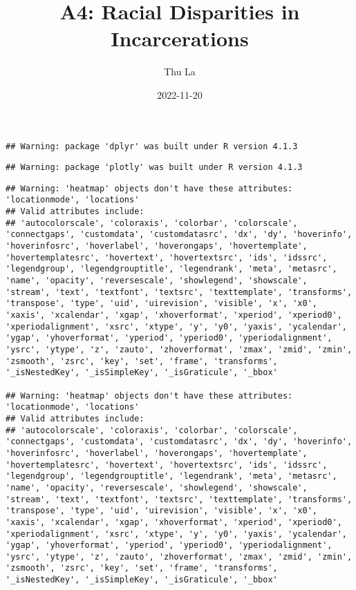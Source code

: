 \documentclass[
]{article}
\title{A4: Racial Disparities in Incarcerations}
\author{Thu La}
\date{2022-11-20}
\begin{document}
\maketitle

\begin{verbatim}
## Warning: package 'dplyr' was built under R version 4.1.3
\end{verbatim}

\begin{verbatim}
## Warning: package 'plotly' was built under R version 4.1.3
\end{verbatim}

\begin{verbatim}
## Warning: 'heatmap' objects don't have these attributes: 'locationmode', 'locations'
## Valid attributes include:
## 'autocolorscale', 'coloraxis', 'colorbar', 'colorscale', 'connectgaps', 'customdata', 'customdatasrc', 'dx', 'dy', 'hoverinfo', 'hoverinfosrc', 'hoverlabel', 'hoverongaps', 'hovertemplate', 'hovertemplatesrc', 'hovertext', 'hovertextsrc', 'ids', 'idssrc', 'legendgroup', 'legendgrouptitle', 'legendrank', 'meta', 'metasrc', 'name', 'opacity', 'reversescale', 'showlegend', 'showscale', 'stream', 'text', 'textfont', 'textsrc', 'texttemplate', 'transforms', 'transpose', 'type', 'uid', 'uirevision', 'visible', 'x', 'x0', 'xaxis', 'xcalendar', 'xgap', 'xhoverformat', 'xperiod', 'xperiod0', 'xperiodalignment', 'xsrc', 'xtype', 'y', 'y0', 'yaxis', 'ycalendar', 'ygap', 'yhoverformat', 'yperiod', 'yperiod0', 'yperiodalignment', 'ysrc', 'ytype', 'z', 'zauto', 'zhoverformat', 'zmax', 'zmid', 'zmin', 'zsmooth', 'zsrc', 'key', 'set', 'frame', 'transforms', '_isNestedKey', '_isSimpleKey', '_isGraticule', '_bbox'

## Warning: 'heatmap' objects don't have these attributes: 'locationmode', 'locations'
## Valid attributes include:
## 'autocolorscale', 'coloraxis', 'colorbar', 'colorscale', 'connectgaps', 'customdata', 'customdatasrc', 'dx', 'dy', 'hoverinfo', 'hoverinfosrc', 'hoverlabel', 'hoverongaps', 'hovertemplate', 'hovertemplatesrc', 'hovertext', 'hovertextsrc', 'ids', 'idssrc', 'legendgroup', 'legendgrouptitle', 'legendrank', 'meta', 'metasrc', 'name', 'opacity', 'reversescale', 'showlegend', 'showscale', 'stream', 'text', 'textfont', 'textsrc', 'texttemplate', 'transforms', 'transpose', 'type', 'uid', 'uirevision', 'visible', 'x', 'x0', 'xaxis', 'xcalendar', 'xgap', 'xhoverformat', 'xperiod', 'xperiod0', 'xperiodalignment', 'xsrc', 'xtype', 'y', 'y0', 'yaxis', 'ycalendar', 'ygap', 'yhoverformat', 'yperiod', 'yperiod0', 'yperiodalignment', 'ysrc', 'ytype', 'z', 'zauto', 'zhoverformat', 'zmax', 'zmid', 'zmin', 'zsmooth', 'zsrc', 'key', 'set', 'frame', 'transforms', '_isNestedKey', '_isSimpleKey', '_isGraticule', '_bbox'


\end{verbatim}
\end{document}

